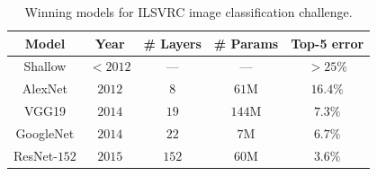 



\begin{table}[htb]
\caption{Winning models for ILSVRC image classification challenge.}
\label{tab:intro}
\begin{center}
\begin{tabular}{|c|c|c|c|c|}
\hline
Model & Year & \# Layers & \# Params & Top-5 error \\
\hline
Shallow & $<2012$ & --- & --- & $>25\%$ \\
\hline
AlexNet & $2012$ & $8$ & $61$M & $16.4\%$ \\
\hline
VGG19 & $2014$ & $19$ & $144$M & $7.3\%$ \\
\hline
GoogleNet & $2014$ & $22$ & $7$M & $6.7\%$ \\
\hline
ResNet-$152$ & $2015$ & $152$ & $60$M & $3.6\%$ \\
\hline
\end{tabular}
\end{center}
\end{table}
